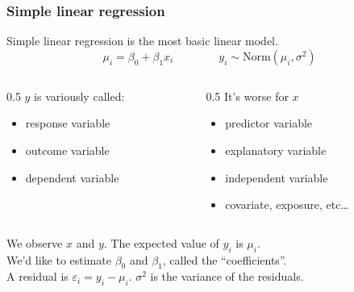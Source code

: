 \documentclass[color=usenames,dvipsnames]{beamer}\usepackage[]{graphicx}\usepackage[]{xcolor}
\begin{document}
\begin{frame}
  \frametitle{Simple linear regression}
  Simple linear regression is the most basic linear model.
  \[
    \mu_i = \beta_0 + \beta_1 x_i \qquad \qquad
    y_i \sim \mathrm{Norm}(\mu_i, \sigma^2)
  \]
  \vspace{-6pt}
  \pause
  \begin{columns}[T]
    \begin{column}{0.5\textwidth}
      $y$ is variously called:
      \begin{itemize}
        \item response variable
        \item outcome variable
        \item dependent variable
      \end{itemize}
    \end{column}
    \pause
    \begin{column}{0.5\textwidth}
      It's worse for $x$
      \begin{itemize}
        \item predictor variable
        \item explanatory variable
        \item independent variable
        \item covariate, exposure, etc\dots
      \end{itemize}
    \end{column}
  \end{columns}
  \pause
  \vfill
  We observe $x$ and $y$. The expected value of $y_i$ is $\mu_i$. \\
  \vfill
  We'd like to estimate $\beta_0$ and $\beta_1$, called the ``coefficients''. \\
  \pause
  \vfill
  A residual is $\varepsilon_i=y_i-\mu_i$.
  \pause
  \vfill
  $\sigma^2$ is the variance of the residuals.
\end{frame}



\end{document}
